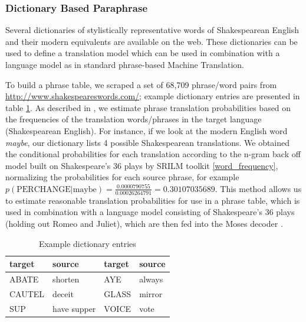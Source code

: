 \documentclass[10pt,a5paper,twoside]{article}
\begin{document}
\subsubsection{Dictionary Based Paraphrase}
\label{dictionary_baseline}
Several dictionaries of stylistically representative words of Shakespearean English and their modern equivalents are available on the web.  
These dictionaries can be used to define a translation model which can be used in combination with a language model as in standard phrase-based Machine
Translation.


To build a phrase table, we scraped a set of 68,709 phrase/word pairs from \url{http://www.shakespeareswords.com/}; 
example dictionary entries are presented in table \ref{dictionary_example}. 
As described in \cite{Koehn00}, we estimate phrase translation probabilities
based on the frequencies of the translation words/phrases in the target language (Shakespearean English).
For instance, if we look at the modern English word \emph{maybe}, our dictionary lists 4 possible Shakespearean translations. 
We obtained the conditional probabilities for each translation according to the n-gram back off model built on Shakespeare's 
36 plays by SRILM toolkit \cite{Stolcke02} \ref{word_frequency}, 
normalizing the probabilities for each source phrase, for example $p(\text{PERCHANGE}|\text{maybe}) = \frac{0.0000790755}{0.00026264791} = 0.30107035689$. 
This method allows us to estimate reasonable translation probabilities for use in a phrase table, which is used in combination 
with a language model consisting of Shakespeare's 36 plays (holding out Romeo and Juliet), which are then fed into the Moses decoder
\cite{Koehn07}.

\begin{table}
  \begin{center}
  \begin{tabular}{|l|l||l|l|}
    \hline
    target & source & target & source \\
    \hline
    \hline
    ABATE & shorten & AYE & always \\
    \hline
    CAUTEL & deceit & GLASS & mirror \\
    \hline
    SUP & have supper & VOICE & vote \\
    \hline
  \end{tabular}
  \end{center}
  \caption{Example dictionary entries}
  \label{dictionary_example}
\end{table}
\end{document}
